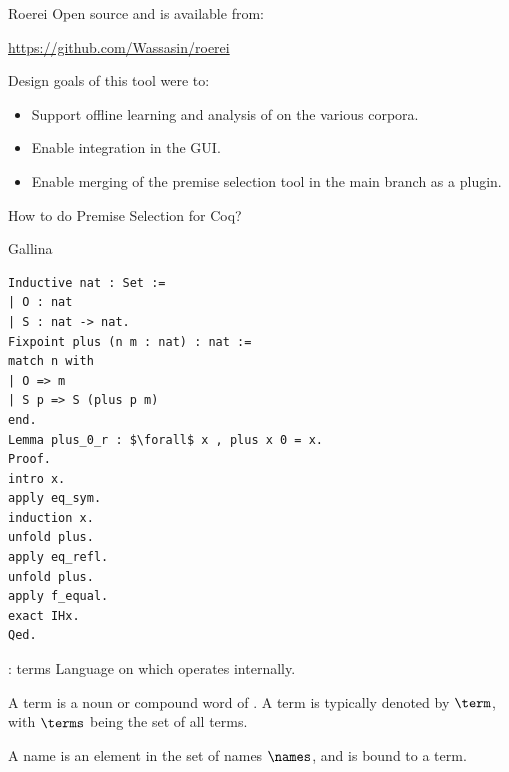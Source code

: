 \begin{frame}{Roerei}
	Open source and is available from:
	\begin{center}
		\url{https://github.com/Wassasin/roerei}
	\end{center}
	\bigskip
	Design goals of this tool were to:
	\begin{itemize}
		\item Support offline learning and analysis of \machinelearning on the various corpora.
		\item Enable integration in the \coqide GUI.
		\item Enable merging of the premise selection tool in the \coq main branch as a plugin.
    \end{itemize}
    
\end{frame}

\begin{frame}{How to do Premise Selection for Coq?}
\end{frame}


\begin{frame}[fragile]{Gallina}
\begin{lstlisting}[language=Coq, mathescape,basicstyle=\footnotesize,frame=none]
Inductive nat : Set :=
| O : nat
| S : nat -> nat.
Fixpoint plus (n m : nat) : nat :=
match n with
| O => m
| S p => S (plus p m)
end.
Lemma plus_0_r : $\forall$ x , plus x 0 = x.
Proof.
intro x.
apply eq_sym.
induction x.
unfold plus.
apply eq_refl.
unfold plus.
apply f_equal.
exact IHx.
Qed.
\end{lstlisting}
\end{frame}

\begin{frame}{\pcic: terms}
	Language on which \coq operates internally.\\
	\bigskip
	\begin{definition}[term]
		A term is a noun or compound word of \pcic.
		A term is typically denoted by $\term$,
		with $\terms$ being the set of all terms.
	\end{definition}
	\bigskip
	\begin{definition}[name]
		A name is an element in the set of names $\names$, and is bound to a term.
	\end{definition}
\end{frame}


